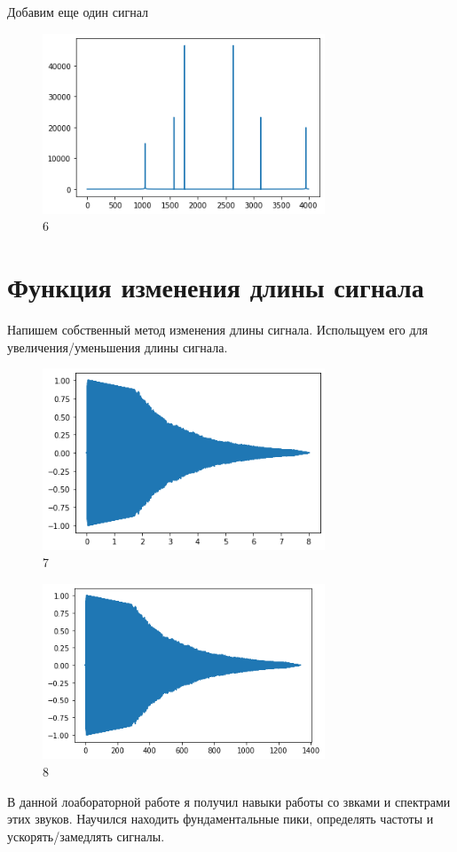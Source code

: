 \documentclass{article}
\begin{document}
Добавим еще один сигнал

\begin{figure}[H]
        \centering
        \includegraphics[width=0.75\textwidth]{pic/8.png}
        \caption{6}
        \label{fig:sixth}
\end{figure}

\section{Функция изменения длины сигнала}
Напишем собственный метод изменения длины сигнала. Испольщуем его для увеличения/уменьшения длины сигнала.
\begin{figure}[H]
        \centering
        \includegraphics[width=0.75\textwidth]{pic/9.png}
        \caption{7}
        \label{fig:seveth}
\end{figure}

\begin{figure}[H]
        \centering
        \includegraphics[width=0.75\textwidth]{pic/10.png}
        \caption{8}
        \label{fig:eight}
\end{figure}
В данной лоабораторной работе я получил навыки работы со звками и спектрами этих звуков. Научился находить фундаментальные пики, определять частоты и ускорять/замедлять сигналы.
\end{document}
